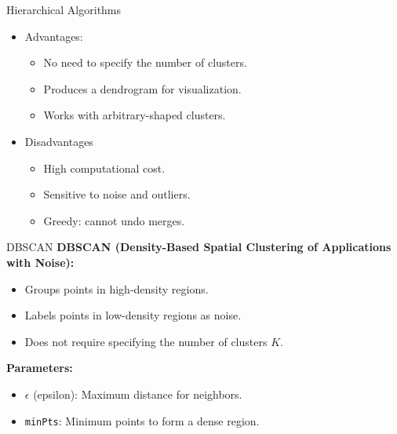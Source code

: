 \documentclass[serif, aspectratio=169]{beamer}
\begin{document}
\begin{frame}{Hierarchical Algorithms}
\begin{itemize}
    \item Advantages:
     \begin{itemize}
        \item No need to specify the number of clusters.
        \item Produces a dendrogram for visualization.
        \item Works with arbitrary-shaped clusters.
    \end{itemize}
    \item Disadvantages
    \begin{itemize}
        \item High computational cost.
        \item Sensitive to noise and outliers.
        \item Greedy: cannot undo merges.
    \end{itemize}
\end{itemize}
   
\end{frame}


\begin{frame}{DBSCAN}
    \textbf{DBSCAN (Density-Based Spatial Clustering of Applications with Noise):}
    \begin{itemize}
        \item Groups points in high-density regions.
        \item Labels points in low-density regions as noise.
        \item Does not require specifying the number of clusters $K$.
    \end{itemize}
    
    \textbf{Parameters:}
    \begin{itemize}
        \item $ \epsilon $ (epsilon): Maximum distance for neighbors.
        \item \texttt{minPts}: Minimum points to form a dense region.
    \end{itemize}
\end{frame}
\end{document}
